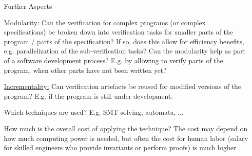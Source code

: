 \documentclass[a4paper]{article}
\begin{document}
\begin{minipage}[t]{0.16\linewidth}
\begin{betterlist}
\begin{betterlist}
		\end{betterlist}
		\item \alert{Further Aspects}
		\begin{betterlist}
			\item \underline{Modularity:} Can the verification for complex programs (or complex specifications) be broken down into verification tasks for smaller parts of the program / parts of the specification? If so, does this allow for efficiency benefits, e.g. parallelization of the sub-verification tasks? Can the modularity help as part of a software development process? E.g. by allowing to verify parts of the program, when other parts have not been written yet?

			\item \underline{Incrementality:} Can verification artefacts be reused for modified versions of the program? E.g. if the program is still under development.

			\item Which techniques are used? E.g. SMT solving, automata, ...

			\item How much is the overall cost of applying the technique? The cost may depend on how much computing power is needed, but often the cost for human labor (salary for skilled engineers who provide invariants or perform proofs) is much higher
		\end{betterlist}
	\end{betterlist}
\end{minipage}
\end{document}

